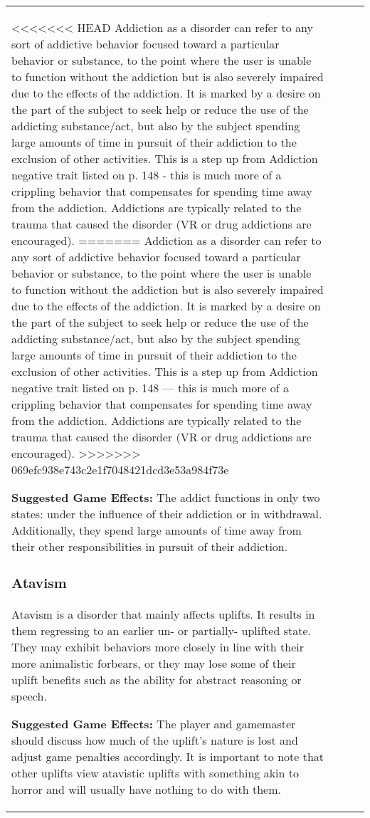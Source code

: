 \begin{table}
\begin{tabular}{|p{8cm}|r|r|r|}
<<<<<<< HEAD Addiction as a disorder can refer to any sort of addictive behavior focused toward a particular behavior or substance, to the point where the user is unable to function without the addiction but is also severely impaired due to the effects of the addiction. It is marked by a desire on the part of the subject to seek help or reduce the use of the addicting substance/act, but also by the subject spending large amounts of time in pursuit of their addiction to the exclusion of other activities. This is a step up from Addiction negative trait listed on p. 148 - this is much more of a crippling behavior that compensates for spending time away from the addiction. Addictions are typically related to the trauma that caused the disorder (VR or drug addictions are encouraged). ======= Addiction as a disorder can refer to any sort of addictive behavior focused toward a particular behavior or substance, to the point where the user is unable to function without the addiction but is also severely impaired due to the effects of the addiction. It is marked by a desire on the part of the subject to seek help or reduce the use of the addicting substance/act, but also by the subject spending large amounts of time in pursuit of their addiction to the exclusion of other activities. This is a step up from Addiction negative trait listed on p. 148 --- this is much more of a crippling behavior that compensates for spending time away from the addiction. Addictions are typically related to the trauma that caused the disorder (VR or drug addictions are encouraged). >>>>>>> 069efc938e743c2e1f7048421dcd3e53a984f73e 

\textbf{Suggested Game Effects:} The addict functions in only two states: under the influence of their addiction or in withdrawal. Additionally, they spend large amounts of time away from their other responsibilities in pursuit of their addiction. 

\subsubsection{Atavism} 

Atavism is a disorder that mainly affects uplifts. It results in them regressing to an earlier un- or partially- uplifted state. They may exhibit behaviors more closely in line with their more animalistic forbears, or they may lose some of their uplift benefits such as the ability for abstract reasoning or speech. 

\textbf{Suggested Game Effects:} The player and gamemaster should discuss how much of the uplift’s nature is lost and adjust game penalties accordingly. It is important to note that other uplifts view atavistic uplifts with something akin to horror and will usually have nothing to do with them. 


\end{tabular}
\end{table}
